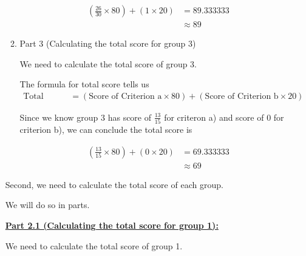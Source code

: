 \documentclass[12pt]{article}
\begin{document}
\begin{mdframed}
\begin{itemize}
\begin{enumerate}[1.]
\begin{mdframed}
                \begin{align}
                    (\frac{26}{30} \times 80) + (1 \times 20) &= 89.333333\\
                    &\approx 89
                \end{align}
            \end{mdframed}

            \item Part 3 (Calculating the total score for group 3)

            \begin{mdframed}
                We need to calculate the total score of group 3.

                \bigskip

                The formula for total score tells us
                \setcounter{equation}{0}
                \begin{align}
                    \text{Total Score} &= (\text{Score of Criterion a} \times 80) + (\text{Score of Criterion b} \times 20)
                \end{align}

                \bigskip

                Since we know group 3 has score of $\frac{13}{15}$ for criteron a) and score of $0$ for
                criterion b), we can conclude the total score is

                \begin{align}
                    (\frac{13}{15} \times 80) + (0 \times 20) &= 69.333333\\
                    &\approx 69
                \end{align}
            \end{mdframed}
        \end{enumerate}

        \begin{mdframed}

            Second, we need to calculate the total score of each group.

            \bigskip

            We will do so in parts.

            \bigskip

            \underline{\textbf{Part 2.1 (Calculating the total score for group 1):}}

            \bigskip

            We need to calculate the total score of group 1.


\end{mdframed}
\end{itemize}
\end{mdframed}
\end{document}
